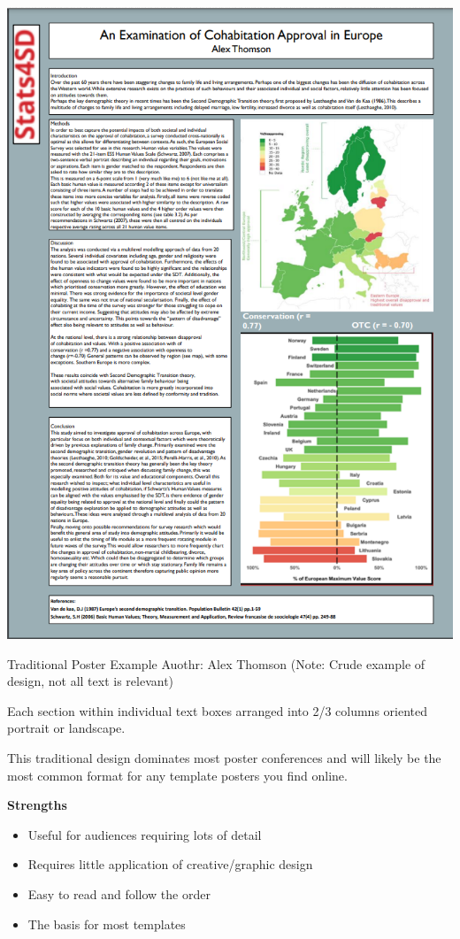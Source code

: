\documentclass[
]{book}
\providecommand{\tightlist}{%
  \setlength{\itemsep}{0pt}\setlength{\parskip}{0pt}}
\begin{document}
\begin{center}\includegraphics[width=9.6in]{img/trad example 1} \end{center}

Traditional Poster Example Auothr: Alex Thomson (Note: Crude example of design, not all text is relevant)

Each section within individual text boxes arranged into 2/3 columns oriented portrait or landscape.

This traditional design dominates most poster conferences and will likely be the most common format for any template posters you find online.

\textbf{Strengths}

\begin{itemize}
\tightlist
\item
  Useful for audiences requiring lots of detail
\item
  Requires little application of creative/graphic design
\item
  Easy to read and follow the order
\item
  The basis for most templates
\end{itemize}
\end{document}
